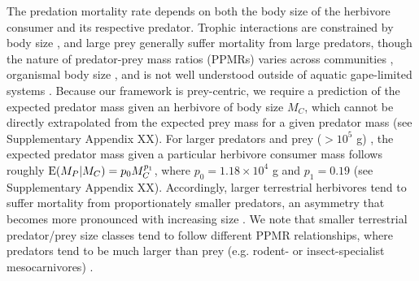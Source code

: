\documentclass[]{rsos}%
\begin{document}

The predation mortality rate depends on both the body size of the herbivore consumer and its respective predator. 
Trophic interactions are constrained by body size \cite{Sinclair2003,Brose2005,Hatton:2015fk}, and large prey generally suffer mortality from large predators, though the nature of predator-prey mass ratios (PPMRs) varies across communities \cite{barnes2010global}, organismal body size \cite{Brose2005,Rohr2010,riede2011stepping,Yeakel2014,pires2015pleistocene}, and is not well understood outside of aquatic gape-limited systems \cite{nakazawa2017individual}.
Because our framework is prey-centric, we require a prediction of the expected predator mass given an herbivore of body size $M_C$, which cannot be directly extrapolated from the expected prey mass for a given predator mass (see Supplementary Appendix XX).
For larger predators and prey ($>10^5$ g) \cite{Hayward2005,Hayward2006,Hayward2008}, the expected predator mass given a particular herbivore consumer mass follows roughly ${\rm E}(M_P|M_C) = p_0 M_C^{p_1}$, where $p_0 = 1.18\times 10^4$ g and $p_1 = 0.19$ (see Supplementary Appendix XX). %
Accordingly, larger terrestrial herbivores tend to suffer mortality from proportionately smaller predators, an asymmetry that becomes more pronounced with increasing size \cite[cf. ][]{Sinclair2003}.
We note that smaller terrestrial predator/prey size classes tend to follow different PPMR relationships, where predators tend to be much larger than prey (e.g. rodent- or insect-specialist mesocarnivores) \cite{cruz2022geography,Cruz2022}.
\end{document}

